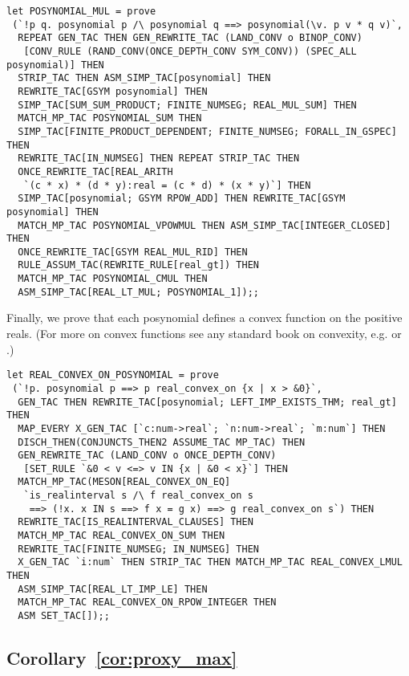 \documentclass[10pt]{article}
\theoremstyle{definition}
\theoremstyle{remark}
\numberwithin{equation}{section}
\begin{document}
\begin{scriptsize}\begin{verbatim}
let POSYNOMIAL_MUL = prove
 (`!p q. posynomial p /\ posynomial q ==> posynomial(\v. p v * q v)`,
  REPEAT GEN_TAC THEN GEN_REWRITE_TAC (LAND_CONV o BINOP_CONV)
   [CONV_RULE (RAND_CONV(ONCE_DEPTH_CONV SYM_CONV)) (SPEC_ALL posynomial)] THEN
  STRIP_TAC THEN ASM_SIMP_TAC[posynomial] THEN
  REWRITE_TAC[GSYM posynomial] THEN
  SIMP_TAC[SUM_SUM_PRODUCT; FINITE_NUMSEG; REAL_MUL_SUM] THEN
  MATCH_MP_TAC POSYNOMIAL_SUM THEN
  SIMP_TAC[FINITE_PRODUCT_DEPENDENT; FINITE_NUMSEG; FORALL_IN_GSPEC] THEN
  REWRITE_TAC[IN_NUMSEG] THEN REPEAT STRIP_TAC THEN
  ONCE_REWRITE_TAC[REAL_ARITH
   `(c * x) * (d * y):real = (c * d) * (x * y)`] THEN
  SIMP_TAC[posynomial; GSYM RPOW_ADD] THEN REWRITE_TAC[GSYM posynomial] THEN
  MATCH_MP_TAC POSYNOMIAL_VPOWMUL THEN ASM_SIMP_TAC[INTEGER_CLOSED] THEN
  ONCE_REWRITE_TAC[GSYM REAL_MUL_RID] THEN
  RULE_ASSUM_TAC(REWRITE_RULE[real_gt]) THEN
  MATCH_MP_TAC POSYNOMIAL_CMUL THEN
  ASM_SIMP_TAC[REAL_LT_MUL; POSYNOMIAL_1]);;
\end{verbatim}\end{scriptsize}

Finally, we prove that each posynomial defines a convex function on the
positive reals. (For more on convex functions see any standard book on
convexity, e.g. \cite{barvinok-convexity} or \cite{webster-convexity}.)

\begin{scriptsize}\begin{verbatim}
let REAL_CONVEX_ON_POSYNOMIAL = prove
 (`!p. posynomial p ==> p real_convex_on {x | x > &0}`,
  GEN_TAC THEN REWRITE_TAC[posynomial; LEFT_IMP_EXISTS_THM; real_gt] THEN
  MAP_EVERY X_GEN_TAC [`c:num->real`; `n:num->real`; `m:num`] THEN
  DISCH_THEN(CONJUNCTS_THEN2 ASSUME_TAC MP_TAC) THEN
  GEN_REWRITE_TAC (LAND_CONV o ONCE_DEPTH_CONV)
   [SET_RULE `&0 < v <=> v IN {x | &0 < x}`] THEN
  MATCH_MP_TAC(MESON[REAL_CONVEX_ON_EQ]
   `is_realinterval s /\ f real_convex_on s
    ==> (!x. x IN s ==> f x = g x) ==> g real_convex_on s`) THEN
  REWRITE_TAC[IS_REALINTERVAL_CLAUSES] THEN
  MATCH_MP_TAC REAL_CONVEX_ON_SUM THEN
  REWRITE_TAC[FINITE_NUMSEG; IN_NUMSEG] THEN
  X_GEN_TAC `i:num` THEN STRIP_TAC THEN MATCH_MP_TAC REAL_CONVEX_LMUL THEN
  ASM_SIMP_TAC[REAL_LT_IMP_LE] THEN
  MATCH_MP_TAC REAL_CONVEX_ON_RPOW_INTEGER THEN
  ASM SET_TAC[]);;
\end{verbatim}\end{scriptsize}

\subsection{Corollary~\ref{cor:proxy_max}}
\end{document}

